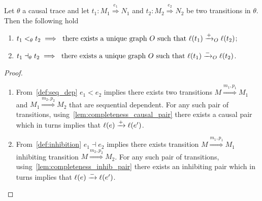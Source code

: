 \begin{lemma}
  \label{lemma:pos_infl}
  Let $\theta$ a causal trace and let $t_1:M_1\overset{e_1}{\Rightarrow}N_1$ and $t_2:M_2\overset{e_2}{\Rightarrow}N_2$ be two transitions in $\theta$. Then the following hold
  \begin{enumerate}
  \item $t_1 <_{\theta} t_2\implies\text{ there exists a unique graph }O\text{ such that }\ell(t_1)\xrightarrow{+}_O\ell(t_2)$;
  \item $t_1\dashv_{\theta} t_2\implies\text{ there exists a unique graph }O\text{ such that }\ell(t_1)\xrightarrow{-}_O\ell(t_2)$.
  \end{enumerate}
\end{lemma}
\begin{proof}
  \begin{enumerate}
  \item From~\autoref{def:seq_dep} $e_1 < e_2$ implies there exists two transitions $M\overset{m_1,p_1}{\Rightarrow} M_1$ and $M_1\overset{m_2,p_2}{\Rightarrow} M_2$ that are sequential dependent. For any such pair of transitions, using~\autoref{lem:completeness_causal_pair} there exists a causal pair which in turns implies that $\ell(e)\xrightarrow{+}\ell(e')$.

  \item From~\autoref{def:inhibition} $e_1 \dashv e_2$ implies there exists transition $M\overset{m_1,p_1}{\Rightarrow} M_1$ inhibiting transition $M\overset{m_2,p_2}{\Rightarrow} M_2$. For any such pair of transitions, using~\autoref{lem:completeness_inhib_pair} there exists an inhibiting pair which in turns implies that $\ell(e)\xrightarrow{-}\ell(e')$.
  \end{enumerate}
\end{proof}


